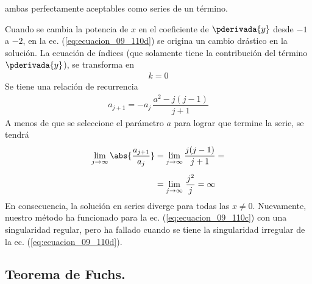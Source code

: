 ambas perfectamente aceptables como series de un término.
\par
Cuando se cambia la potencia de $x$ en el coeficiente de $\pderivada{y}$ desde $-1$ a $-2$, en la ec. (\ref{eq:ecuacion_09_110d}) se origina un cambio drástico en la solución. La ecuación de índices (que solamente tiene la contribución del término $\pderivada{y}$), se transforma en
\begin{align*}
k = 0
\end{align*}
Se tiene una relación de recurrencia
\begin{align*}
a_{j+1} = - a_{j} \, \dfrac{a^{2} - j (j - 1)}{j + 1}
\end{align*}
A menos de que se seleccione el parámetro $a$ para lograr que termine la serie, se tendrá
\begin{align*}
\lim_{j \to \infty} \abs{ \dfrac{a_{j+1}}{a_{j}}} &= \lim_{j \to \infty} \dfrac{j (j - 1)}{j + 1} = \\[0.5em]
&= \lim_{j \to \infty} \, \dfrac{j^{2}}{j} = \infty
\end{align*}
En consecuencia, la solución en series diverge para todas las $x \neq 0$. Nuevamente, nuestro método ha funcionado para la ec. (\ref{eq:ecuacion_09_110c}) con una singularidad regular, pero ha fallado cuando se tiene la singularidad irregular de la ec. (\ref{eq:ecuacion_09_110d}).

\subsection{Teorema de Fuchs.}

